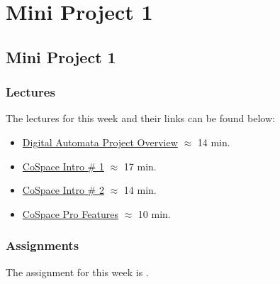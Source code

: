 \clearpage

\renewcommand{\ChapTitle}{Mini Project 1}
\renewcommand{\SectionTitle}{Mini Project 1}

\chapter{\ChapTitle}
\section{\SectionTitle}

\subsection{Lectures}

The lectures for this week and their links can be found below:

\begin{itemize}
    \item \href{https://applied.cs.colorado.edu/mod/hvp/view.php?id=49340}{Digital Automata Project Overview} $\approx$ 14 min.
    \item \href{https://applied.cs.colorado.edu/mod/hvp/view.php?id=49341}{CoSpace Intro \# 1} $\approx$ 17 min.
    \item \href{https://applied.cs.colorado.edu/mod/hvp/view.php?id=49342}{CoSpace Intro \# 2} $\approx$ 14 min.
    \item \href{https://applied.cs.colorado.edu/mod/hvp/view.php?id=49343}{CoSpace Pro Features} $\approx$ 10 min.
\end{itemize}

\subsection{Assignments}

The assignment for this week is .  